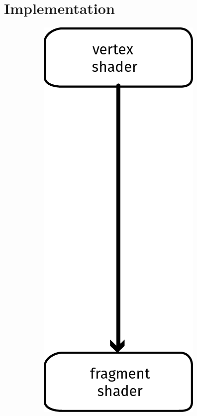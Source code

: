 
\section{Implementation}
\label{s:implementation}

\begin{figure}
	\centering
	\begin{subfigure}[b]{0.4\columnwidth}
		\centering
		\includegraphics[width=\textwidth]{content/img/implementation/pipeline_oldOpenGL.png}

\end{subfigure}
\end{figure}
